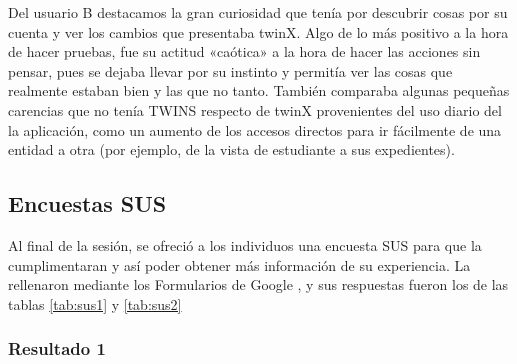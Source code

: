 Del usuario B destacamos la gran curiosidad que tenía por descubrir cosas por su cuenta y ver los cambios que presentaba twinX. Algo de lo más positivo a la hora de hacer pruebas, fue su actitud «caótica» a la hora de hacer las acciones sin pensar, pues se dejaba llevar por su instinto y permitía ver las cosas que realmente estaban bien y las que no tanto. También comparaba algunas pequeñas carencias que no tenía TWINS respecto de twinX provenientes del uso diario del la aplicación, como un aumento de los accesos directos para ir fácilmente de una entidad a otra (por ejemplo, de la vista de estudiante a sus expedientes).

\subsection{Encuestas SUS}

Al final de la sesión, se ofreció a los individuos una encuesta SUS para que la cumplimentaran y así poder obtener más información de su experiencia. La rellenaron mediante los Formularios de Google \cite{googleforms}, y sus respuestas fueron los de las tablas \ref{tab:sus1} y \ref{tab:sus2}

\subsubsection*{Resultado 1}

